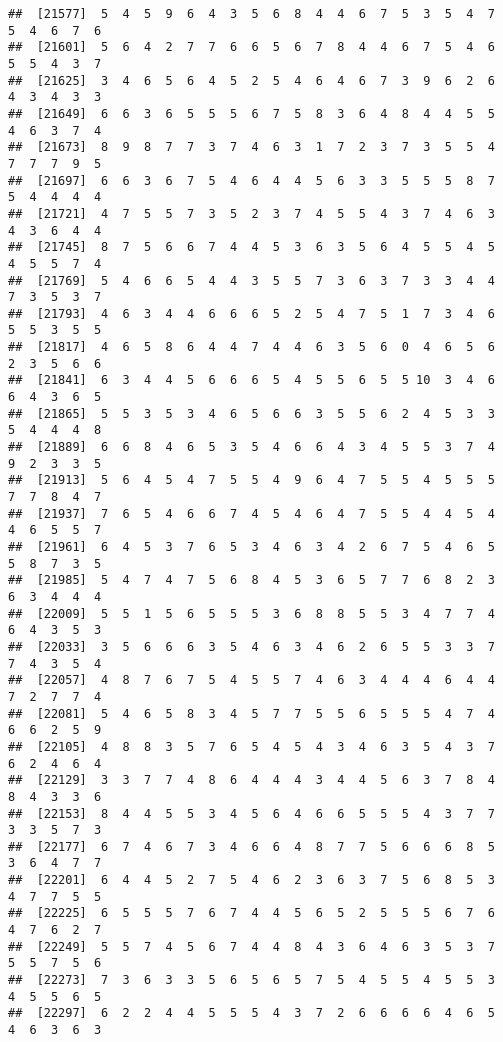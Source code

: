 \documentclass[
]{book}
\begin{document}
\begin{verbatim}
##  [21577]  5  4  5  9  6  4  3  5  6  8  4  4  6  7  5  3  5  4  7  5  4  6  7  6
##  [21601]  5  6  4  2  7  7  6  6  5  6  7  8  4  4  6  7  5  4  6  5  5  4  3  7
##  [21625]  3  4  6  5  6  4  5  2  5  4  6  4  6  7  3  9  6  2  6  4  3  4  3  3
##  [21649]  6  6  3  6  5  5  5  6  7  5  8  3  6  4  8  4  4  5  5  4  6  3  7  4
##  [21673]  8  9  8  7  7  3  7  4  6  3  1  7  2  3  7  3  5  5  4  7  7  7  9  5
##  [21697]  6  6  3  6  7  5  4  6  4  4  5  6  3  3  5  5  5  8  7  5  4  4  4  4
##  [21721]  4  7  5  5  7  3  5  2  3  7  4  5  5  4  3  7  4  6  3  4  3  6  4  4
##  [21745]  8  7  5  6  6  7  4  4  5  3  6  3  5  6  4  5  5  4  5  4  5  5  7  4
##  [21769]  5  4  6  6  5  4  4  3  5  5  7  3  6  3  7  3  3  4  4  7  3  5  3  7
##  [21793]  4  6  3  4  4  6  6  6  5  2  5  4  7  5  1  7  3  4  6  5  5  3  5  5
##  [21817]  4  6  5  8  6  4  4  7  4  4  6  3  5  6  0  4  6  5  6  2  3  5  6  6
##  [21841]  6  3  4  4  5  6  6  6  5  4  5  5  6  5  5 10  3  4  6  6  4  3  6  5
##  [21865]  5  5  3  5  3  4  6  5  6  6  3  5  5  6  2  4  5  3  3  5  4  4  4  8
##  [21889]  6  6  8  4  6  5  3  5  4  6  6  4  3  4  5  5  3  7  4  9  2  3  3  5
##  [21913]  5  6  4  5  4  7  5  5  4  9  6  4  7  5  5  4  5  5  5  7  7  8  4  7
##  [21937]  7  6  5  4  6  6  7  4  5  4  6  4  7  5  5  4  4  5  4  4  6  5  5  7
##  [21961]  6  4  5  3  7  6  5  3  4  6  3  4  2  6  7  5  4  6  5  5  8  7  3  5
##  [21985]  5  4  7  4  7  5  6  8  4  5  3  6  5  7  7  6  8  2  3  6  3  4  4  4
##  [22009]  5  5  1  5  6  5  5  5  3  6  8  8  5  5  3  4  7  7  4  6  4  3  5  3
##  [22033]  3  5  6  6  6  3  5  4  6  3  4  6  2  6  5  5  3  3  7  7  4  3  5  4
##  [22057]  4  8  7  6  7  5  4  5  5  7  4  6  3  4  4  4  6  4  4  7  2  7  7  4
##  [22081]  5  4  6  5  8  3  4  5  7  7  5  5  6  5  5  5  4  7  4  6  6  2  5  9
##  [22105]  4  8  8  3  5  7  6  5  4  5  4  3  4  6  3  5  4  3  7  6  2  4  6  4
##  [22129]  3  3  7  7  4  8  6  4  4  4  3  4  4  5  6  3  7  8  4  8  4  3  3  6
##  [22153]  8  4  4  5  5  3  4  5  6  4  6  6  5  5  5  4  3  7  7  3  3  5  7  3
##  [22177]  6  7  4  6  7  3  4  6  6  4  8  7  7  5  6  6  6  8  5  3  6  4  7  7
##  [22201]  6  4  4  5  2  7  5  4  6  2  3  6  3  7  5  6  8  5  3  4  7  7  5  5
##  [22225]  6  5  5  5  7  6  7  4  4  5  6  5  2  5  5  5  6  7  6  4  7  6  2  7
##  [22249]  5  5  7  4  5  6  7  4  4  8  4  3  6  4  6  3  5  3  7  5  5  7  5  6
##  [22273]  7  3  6  3  3  5  6  5  6  5  7  5  4  5  5  4  5  5  3  4  5  5  6  5
##  [22297]  6  2  2  4  4  5  5  5  4  3  7  2  6  6  6  6  4  6  5  4  6  3  6  3

\end{verbatim}
\end{document}
